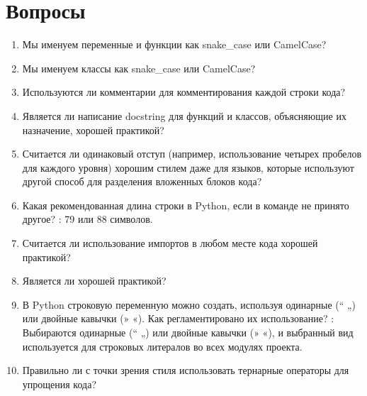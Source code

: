 \documentclass[letterpaper,10pt,russian]{sphinxmanual}
\begin{document}
\section{Вопросы}
\label{\detokenize{educational_materials/styles/quiz:id1}}\label{\detokenize{educational_materials/styles/quiz::doc}}\begin{enumerate}
%
\item {} 
\sphinxAtStartPar
Мы именуем переменные и функции как snake\_case или CamelCase?

\item {} 
\sphinxAtStartPar
Мы именуем классы как snake\_case или CamelCase?

\item {} 
\sphinxAtStartPar
Используются ли комментарии для комментирования каждой строки кода?

\item {} 
\sphinxAtStartPar
Является ли написание docstring для функций и классов, объясняющие их назначение, хорошей практикой?

\item {} 
\sphinxAtStartPar
Считается ли одинаковый отступ (например, использование четырех пробелов для каждого уровня) хорошим стилем даже для языков, которые используют другой способ для разделения вложенных блоков кода?

\item {} 
\sphinxAtStartPar
Какая рекомендованная длина строки в Python, если в команде не принято другое? : 79 или 88 символов.

\item {} 
\sphinxAtStartPar
Считается ли использование импортов в любом месте кода хорошей практикой?

\item {} 
\sphinxAtStartPar
Является ли  хорошей практикой?

\item {} 
\sphinxAtStartPar
В Python строковую переменную можно создать, используя одинарные (“ „) или двойные кавычки (» «). Как регламентировано их использование? : Выбираются одинарные (“ „) или двойные кавычки (» «), и выбранный вид используется для строковых литералов во всех модулях проекта.

\item {} 
\sphinxAtStartPar
Правильно ли с точки зрения стиля использовать тернарные операторы для упрощения кода?


\end{enumerate}
\end{document}
